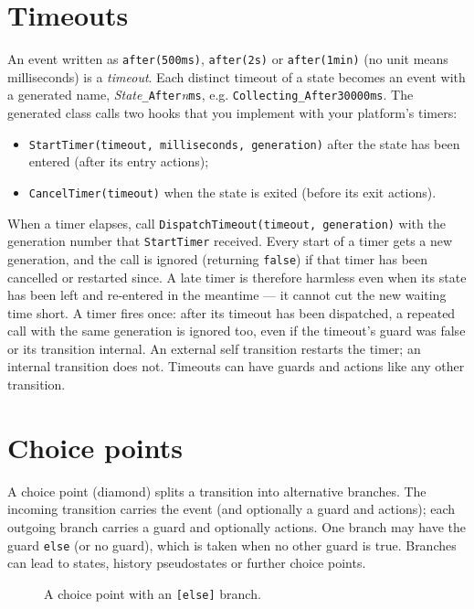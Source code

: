 \documentclass[11pt,a4paper,openany]{report}
\newcommand{\code}[1]{\texttt{#1}}
\begin{document}
\section{Timeouts}
\label{sec:timeouts}
An event written as \code{after(500ms)}, \code{after(2s)} or \code{after(1min)} (no unit means
milliseconds) is a \emph{timeout}. Each distinct timeout of a state becomes an event with a generated
name, \textit{State}\code{\_After}\textit{n}\code{ms}, e.g. \code{Collecting\_After30000ms}. The
generated class calls two hooks that you implement with your platform's timers:
\begin{itemize}[itemsep=1pt]
  \item \code{StartTimer(timeout, milliseconds, generation)} after the state has been entered (after
        its entry actions);
  \item \code{CancelTimer(timeout)} when the state is exited (before its exit actions).
\end{itemize}
When a timer elapses, call \code{DispatchTimeout(timeout, generation)} with the generation number that
\code{StartTimer} received. Every start of a timer gets a new generation, and the call is ignored
(returning \code{false}) if that timer has been cancelled or restarted since. A late timer is
therefore harmless even when its state has been left and re-entered in the meantime --- it cannot
cut the new waiting time short. A timer fires once: after its timeout has been dispatched, a repeated
call with the same generation is ignored too, even if the timeout's guard was false or its transition
internal. An external self transition restarts the timer; an internal transition does not. Timeouts
can have guards and actions like any other transition.

\section{Choice points}
\label{sec:choice}
A choice point (diamond) splits a transition into alternative branches. The incoming transition
carries the event (and optionally a guard and actions); each outgoing branch carries a guard and
optionally actions. One branch may have the guard \code{else} (or no guard), which is taken when no
other guard is true. Branches can lead to states, history pseudostates or further choice points.

\begin{figure}[H]
\centering
{}
\caption{A choice point with an \code{[else]} branch.}
\end{figure}
\end{document}
